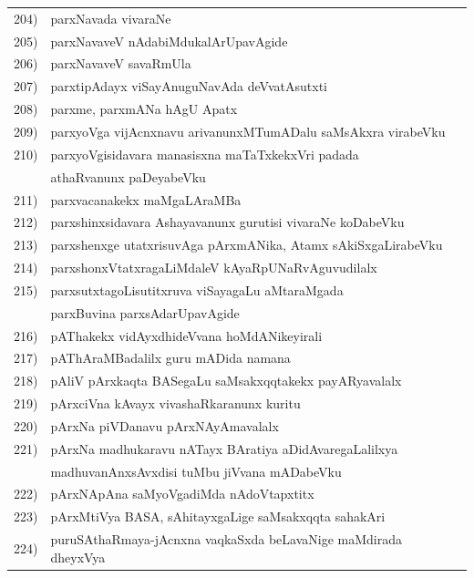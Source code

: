 {\begin{longtable}{@{}cp{7.4cm}r}
204) & parxNavada vivaraNe & \pageref{page121}\\
205) & parxNavaveV nAdabiMdukalArUpavAgide & \pageref{page161}\\
206) & parxNavaveV savaRmUla & \pageref{page100}\\
207) & parxtipAdayx viSayAnuguNavAda deVvatAsutxti & \pageref{page128}\\
208) & parxme, parxmANa hAgU Apatx & \pageref{page135}\\
209) & parxyoVga vijAcnxnavu arivanunxMTumADalu saMsAkxra virabeVku & \pageref{page162}\\
210) & parxyoVgisidavara manasisxna maTaTxkekxVri padada & \\
     & athaRvanunx paDeyabeVku & \pageref{page216}\\
211) & parxvacanakekx maMgaLAraMBa & \pageref{page102}\\ 
212) & parxshinxsidavara Ashayavanunx gurutisi vivaraNe koDabeVku & \pageref{page218}\\
213) & parxshenxge utatxrisuvAga pArxmANika, Atamx sAkiSxgaLirabeVku & \pageref{page141}\\
214) & parxshonxVtatxragaLiMdaleV kAyaRpUNaRvAguvudilalx & \pageref{page213}\\
215) & parxsutxtagoLisutitxruva viSayagaLu aMtaraMgada  & \\
     & parxBuvina parxsAdarUpavAgide & \pageref{page130}\\
216) & pAThakekx vidAyxdhideVvana hoMdANikeyirali & \pageref{page64}\\
217) & pAThAraMBadalilx guru mADida namana & \pageref{page64}\\
218) & pAliV pArxkaqta BASegaLu saMsakxqqtakekx payARyavalalx & \pageref{page44b}\\
219) & pArxciVna kAvayx vivashaRkaranunx kuritu & \pageref{page247}\\
220) & pArxNa piVDanavu pArxNAyAmavalalx &\pageref{page202}\\  
221) & pArxNa madhukaravu nATayx BAratiya aDidAvaregaLalilxya & \\
     & madhuvanAnxsAvxdisi tuMbu jiVvana mADabeVku & \pageref{page81}\\
222) & pArxNApAna saMyoVgadiMda nAdoVtapxtitx & \pageref{page170}\\
223) & pArxMtiVya BASA, sAhitayxgaLige saMsakxqqta sahakAri & \pageref{page36a}\\
224) & puruSAthaRmaya-jAcnxna vaqkaSxda beLavaNige maMdirada dheyxVya & \pageref{page65}\\

\end{longtable}}

